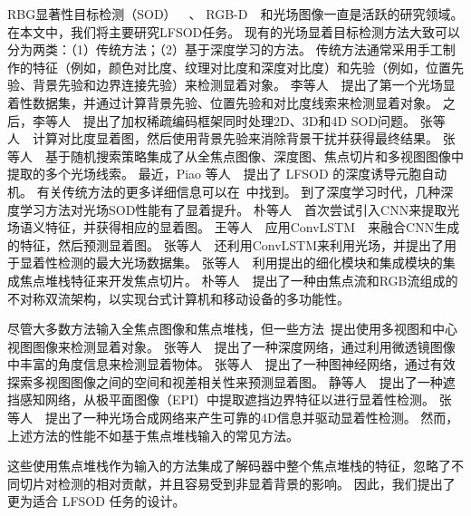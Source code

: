  RBG显著性目标检测（SOD）~\cite{ ma2021pyramidal, wei2020f3net, zhou2020interactive}~、
 RGB-D~\cite{ cong2022cir, ji2021calibrated, liu2021visual}~和光场图像一直是活跃的研究领域。 
 在本文中，我们将主要研究LFSOD任务。
 现有的光场显着目标检测方法大致可以分为两类：（1）传统方法；（2）基于深度学习的方法。 传统方法通常采用手工制作的特征（例如，颜色对比度、纹理对比度和深度对比度）和先验（例如，位置先验、背景先验和边界连接先验）来检测显着对象。 
% 
%
%
%
 李等人~\cite{li2014saliency}~提出了第一个光场显着性数据集，并通过计算背景先验、位置先验和对比度线索来检测显着对象。
 之后，李等人~\cite{li2015weighted}~提出了加权稀疏编码框架同时处理2D、3D和4D SOD问题。
 张等人~\cite{zhang2015saliency}~计算对比度显着图，然后使用背景先验来消除背景干扰并获得最终结果。 
 张等人~\cite{zhang2017saliency}~基于随机搜索策略集成了从全焦点图像、深度图、焦点切片和多视图图像中提取的多个光场线索。 
 最近，Piao 等人~\cite{piao2019saliency}~提出了 LFSOD 的深度诱导元胞自动机。
 有关传统方法的更多详细信息可以在\cite{fu2022light}~中找到。
 到了深度学习时代，几种深度学习方法对光场SOD性能有了显着提升。 
 朴等人~\cite{piao2019deep}~首次尝试引入CNN来提取光场语义特征，并获得相应的显着图。 
 王等人~\cite{wang2019deep}~应用ConvLSTM~\cite{shi2015convolutional}~来融合CNN生成的特征，然后预测显着图。
 张等人~\cite{zhang2019memory}~还利用ConvLSTM来利用光场，并提出了用于显着性检测的最大光场数据集。 
 张等人~\cite{zhang2020lfnet}~利用提出的细化模块和集成模块的集成焦点堆栈特征来开发焦点切片。
朴等人~\cite{piao2020exploit}~提出了一种由焦点流和RGB流组成的不对称双流架构，以实现台式计算机和移动设备的多功能性。
%
%
%
%
\par
%
尽管大多数方法输入全焦点图像和焦点堆栈，但一些方法\cite{jing2021occlusion, wang2022lfbcnet, zhang2022exploring}~提出使用多视图和中心视图图像来检测显着对象。 
张等人~\cite{zhang2020light}~提出了一种深度网络，通过利用微透镜图像中丰富的角度信息来检测显着物体。 
张等人~\cite{zhang2021geometry}~提出了一种图神经网络，通过有效探索多视图图像之间的空间和视差相关性来预测显着图。 
静等人~\cite{jing2021occlusion}~提出了一种遮挡感知网络，从极平面图像（EPI）中提取遮挡边界特征以进行显着性检测。 
张等人~\cite{zhang2022exploring}~提出了一种光场合成网络来产生可靠的4D信息并驱动显着性检测。 
然而，上述方法的性能不如基于焦点堆栈输入的常见方法。 

这些使用焦点堆栈作为输入的方法集成了解码器中整个焦点堆栈的特征，忽略了不同切片对检测的相对贡献，并且容易受到非显着背景的影响。 因此，我们提出了更为适合 LFSOD 任务的设计。
 

